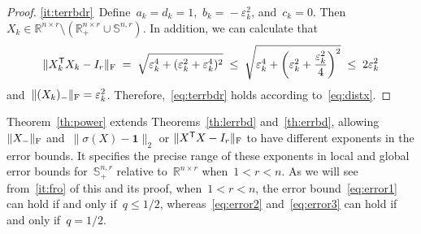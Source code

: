\documentclass[11pt,a4paper]{article}  %
\theoremstyle{definition}
\newcommand{\RR}{\mathbb{R}}
\newcommand{\col}{r}
\newcommand{\stf}[1]{\mathbb{S}^{#1}}
\newcommand{\fro}{{\scriptstyle{\textnormal{F}}}}
\newcommand{\trs}{{\scriptstyle{\mathsf{T}}}}
\newcommand{\ones}{\mathbf{1}}
\begin{document}
\begin{proof}
\ref{it:terrbdr}~Define~$a_k \!= d_k \!= 1$,~$b_k = \!-\varepsilon_k^2$, and~$c_k = 0$.
Then~$X_k \!\in \RR^{n\times \col}\setminus(\RR^{n\times \col}_+ \cup \stf{n,\col})$.
In addition, we can calculate that
\begin{equation}
    \nonumber
    \|X_k^\trs X_k - I_\col\|_\fro
    \;=\; \sqrt{\varepsilon_k^4 + (\varepsilon_k^2 + \varepsilon_k^4)^2}  \;\le\;
    \sqrt{\varepsilon_k^4 + \left(\varepsilon_k^2+\frac{\varepsilon_k^2}{4}\right)^2}  \;\le\;   2\varepsilon_k^2
\end{equation}
and~$\|(X_k)_{-}\|_\fro = \varepsilon_k^2$. Therefore,~\eqref{eq:terrbdr} holds according to~\eqref{eq:distx}.
\end{proof}



Theorem~\ref{th:power} extends Theorems~\ref{th:lerrbd} and~\ref{th:errbd},
allowing~$\|X_{-}\|_\fro$ and~$\|\sigma(X) - \ones\|_2$ or
$\|X^\trs X - I_\col\|_\fro$ to have different exponents in the error bounds.
It specifies the precise range of these exponents in local and global error bounds
for~$\stf{n,\col}_+$ relative to~$\RR^{n\times\col}$ when~$1< \col < n$.
As we will see from~\ref{it:fro} of this and its proof,
when~$1< \col < n$, the error bound~\eqref{eq:error1} can hold if and only if~$q \le 1/2$,
whereas~\eqref{eq:error2} and~\eqref{eq:error3} can hold if and only if~$q = 1/2$.
\end{document}
